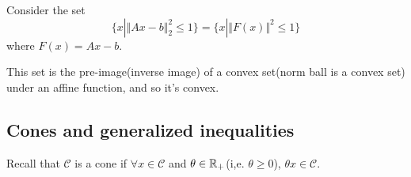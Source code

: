 \begin{example}Consider the set
	$$\{x | \Vert Ax - b \Vert^2_2 \leq 1 \} = \{x | \Vert F(x) \Vert^2 \leq 1 \}$$
	where $F(x) = Ax - b$.

	This set is the pre-image(inverse image) of a convex set(norm ball is a convex set) under an affine function, and so it's convex.
\end{example}




%
%
%	
%	
%
%	
%
%	
%	
%	
%

\vspace{0.5cm}
\subsection{Cones and generalized inequalities}
Recall that
$\mathcal{C}$ is a cone if $\forall x\in \mathcal{C}$ and $\theta \in \mathbb{R}_{+}$(i,e. $\theta \geq 0$), $\theta x\in \mathcal{C}$.   

